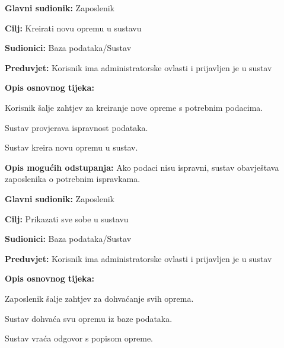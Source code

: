                 \noindent {}
					\begin{packed_item}
	
						\item \textbf{Glavni sudionik: }Zaposlenik
						\item  \textbf{Cilj:} Kreirati novu opremu u sustavu
						\item  \textbf{Sudionici:} Baza podataka/Sustav
						\item  \textbf{Preduvjet:} Korisnik ima administratorske ovlasti i prijavljen je u sustav
						\item  \textbf{Opis osnovnog tijeka:}
						
						\item[] \begin{packed_enum}
	
							\item Korisnik šalje zahtjev za kreiranje nove opreme s potrebnim podacima.
							\item Sustav provjerava ispravnost podataka.
                            \item Sustav kreira novu opremu u sustav.
	
						\end{packed_enum}
						
						\item  \textbf{Opis mogućih odstupanja:} Ako podaci nisu ispravni, sustav obavještava zaposlenika o potrebnim ispravkama.
						
						
					\end{packed_item}

                \noindent {}
					\begin{packed_item}
	
						\item \textbf{Glavni sudionik: }Zaposlenik
						\item  \textbf{Cilj:} Prikazati sve sobe u sustavu
						\item  \textbf{Sudionici:} Baza podataka/Sustav
						\item  \textbf{Preduvjet:} Korisnik ima administratorske ovlasti i prijavljen je u sustav
						\item  \textbf{Opis osnovnog tijeka:}
						
						\item[] \begin{packed_enum}
	
							\item Zaposlenik šalje zahtjev za dohvaćanje svih oprema.
							\item Sustav dohvaća svu opremu iz baze podataka.
                            \item Sustav vraća odgovor s popisom opreme.
	
						\end{packed_enum}
						
					\end{packed_item}


